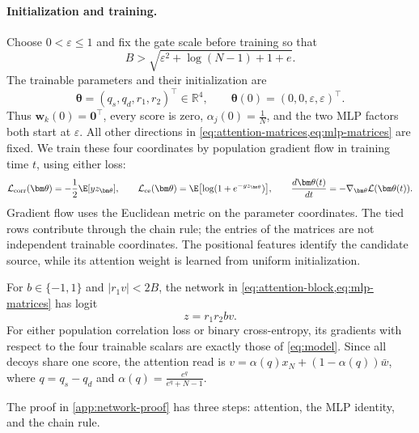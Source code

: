 \paragraph{Initialization and training.}
Choose $0<\varepsilon\le1$ and fix the gate scale before training so that
\begin{equation}
 B>\sqrt{\varepsilon^2+\log(N-1)+1+e}.
 \label{eq:gate-bound}
\end{equation}
The trainable parameters and their initialization are
\begin{equation}
 \bm\theta=(q_s,q_d,r_1,r_2)^\top\in\mathbb R^4,\qquad
 \bm\theta(0)=(0,0,\varepsilon,\varepsilon)^\top.
 \label{eq:initialization}
\end{equation}
Thus $\bm w_k(0)=\bm0^\top$, every score is zero, $\alpha_j(0)=\tfrac{1}{N}$,
and the two MLP factors both start at $\varepsilon$.
All other directions in \cref{eq:attention-matrices,eq:mlp-matrices} are fixed.
We train these four coordinates by population gradient flow in training time $t$, using either loss:
\begin{equation}
 \mathcal L_{\mathrm{corr}}(\bm\theta)=-\frac{1}{2}\E[y z_{\bm\theta}],\qquad
 \mathcal L_{\mathrm{ce}}(\bm\theta)=\E\bigl[\log(1+e^{-y z_{\bm\theta}})\bigr],\qquad
 \frac{d\bm\theta(t)}{dt}=-\nabla_{\bm\theta}\mathcal L(\bm\theta(t)).
 \label{eq:parameter-flow}
\end{equation}
Gradient flow uses the Euclidean metric on the parameter coordinates.
The tied rows contribute through the chain rule; the entries of the matrices are not independent trainable coordinates.
The positional features identify the candidate source, while its attention weight is learned from uniform initialization.

\begin{proposition}
\label{prop:realization}
For $b\in\{-1,1\}$ and $|r_1v|<2B$, the network in \cref{eq:attention-block,eq:mlp-matrices} has logit
\begin{equation}
 z=r_1r_2b v.
 \label{eq:model}
\end{equation}
For either population correlation loss or binary cross-entropy, its gradients with respect to the four trainable scalars
are exactly those of \cref{eq:model}. Since all decoys share one score, the attention read is
$v=\alpha(q)x_N+(1-\alpha(q))\bar w$, where
$q=q_s-q_d$ and $\alpha(q)=\tfrac{e^q}{e^q+N-1}$.
\end{proposition}
The proof in \cref{app:network-proof} has three steps: attention, the MLP identity, and the chain rule.


